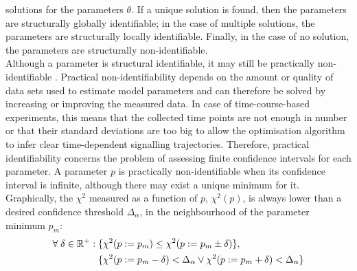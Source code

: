 solutions for the parameters $\theta$. If a unique solution is found, then the parameters are structurally globally identifiable; in the case of multiple solutions, the parameters are structurally locally identifiable. Finally, in the case of no solution, the parameters are structurally non-identifiable. \\
Although a parameter is structural identifiable, it may still be practically non-identifiable \citep{Raue2009, Raue2010}. Practical non-identifiability depends on the amount or quality of data sets used to estimate model parameters and can therefore be solved by increasing or improving the measured data. In case of time-course-based experiments, this means that the collected time points are not enough in number or that their standard deviations are too big to allow the optimisation algorithm to infer clear time-dependent signalling trajectories. Therefore, practical identifiability concerns the problem of assessing finite confidence intervals for each parameter. A parameter $p$ is practically non-identifiable when its confidence interval is infinite, although there may exist a unique minimum for it. Graphically, the $\chi^2$ measured as a function of $p$, $\chi^2(p)$, is always lower than a desired confidence threshold $\Delta_\alpha$, in the neighbourhood of the parameter minimum $p_m$:
\begin{align}
  \label{eq:practical_nonidentifiability}
  \forall \; \delta \in \mathbb{R}^{+}: \; &\{\chi^2(p:=p_m) \le \chi^2(p:=p_m \pm \delta)\}, \\
  &\{\chi^2(p:=p_m - \delta) < \Delta_\alpha \vee \chi^2(p:=p_m + \delta) < \Delta_\alpha \} \notag 
\end{align}
